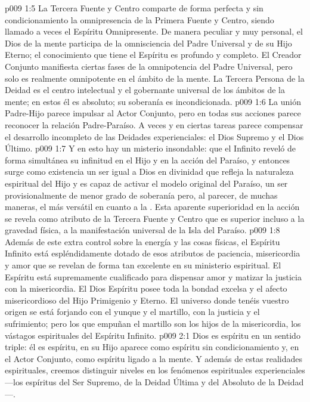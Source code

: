 \vs p009 1:5 \pc La Tercera Fuente y Centro comparte de forma perfecta y sin condicionamiento la omnipresencia de la Primera Fuente y Centro, siendo llamado a veces el Espíritu Omnipresente. De manera peculiar y muy personal, el Dios de la mente participa de la omnisciencia del Padre Universal y de su Hijo Eterno; el conocimiento que tiene el Espíritu es profundo y completo. El Creador Conjunto manifiesta ciertas fases de la omnipotencia del Padre Universal, pero solo es realmente omnipotente en el ámbito de la mente. La Tercera Persona de la Deidad es el centro intelectual y el gobernante universal de los ámbitos de la mente; en estos él es absoluto; su soberanía es incondicionada.
\vs p009 1:6 La unión Padre\hyp{}Hijo parece impulsar al Actor Conjunto, pero en todas sus acciones parece reconocer la relación Padre\hyp{}Paraíso. A veces y en ciertas tareas parece compensar el desarrollo incompleto de las Deidades experienciales: el Dios Supremo y el Dios Último.
\vs p009 1:7 \pc Y en esto hay un misterio insondable: que el Infinito reveló de forma simultánea su infinitud en el Hijo y en la acción del Paraíso, y entonces surge como existencia un ser igual a Dios en divinidad que refleja la naturaleza espiritual del Hijo y es capaz de activar el modelo original del Paraíso, un ser provisionalmente de menor grado de soberanía pero, al parecer, de muchas maneras, el más versátil en cuanto a la . Esta aparente superioridad en la acción se revela como atributo de la Tercera Fuente y Centro que es superior incluso a la gravedad física, a la manifestación universal de la Isla del Paraíso.
\vs p009 1:8 Además de este extra control sobre la energía y las cosas físicas, el Espíritu Infinito está espléndidamente dotado de esos atributos de paciencia, misericordia y amor que se revelan de forma tan excelente en su ministerio espiritual. El Espíritu está supremamente cualificado para dispensar amor y matizar la justicia con la misericordia. El Dios Espíritu posee toda la bondad excelsa y el afecto misericordioso del Hijo Primigenio y Eterno. El universo donde tenéis vuestro origen se está forjando con el yunque y el martillo, con la justicia y el sufrimiento; pero los que empuñan el martillo son los hijos de la misericordia, los vástagos espirituales del Espíritu Infinito.
\vs p009 2:1 Dios es espíritu en un sentido triple: él es espíritu, en su Hijo aparece como espíritu sin condicionamiento y, en el Actor Conjunto, como espíritu ligado a la mente. Y además de estas realidades espirituales, creemos distinguir niveles en los fenómenos espirituales experienciales ---los espíritus del Ser Supremo, de la Deidad Última y del Absoluto de la Deidad---.
